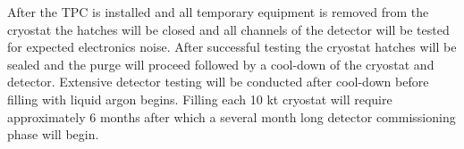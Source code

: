 After the TPC is installed and all temporary equipment is removed from the cryostat the hatches will be 
closed and all channels of the detector will be tested for expected electronics noise. After successful 
testing the cryostat hatches will be sealed and the purge will proceed followed by a cool-down of the 
cryostat and detector.  Extensive detector testing will be conducted after cool-down before filling with 
liquid argon begins. Filling each 10 kt cryostat will require approximately 6 months after which a several 
month long detector commissioning phase will begin.


